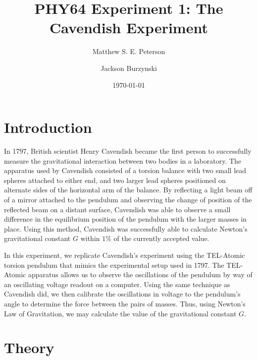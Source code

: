 \documentclass[aps, reprint,amsmath,amssymb]{revtex4-1} %
\begin{document}
\title{PHY64 Experiment 1: The Cavendish Experiment}
\author{Matthew S. E. Peterson}
\author{Jackson Burzynski}
\date{\today} 
\maketitle

\section{Introduction}

In 1797, British scientist Henry Cavendish became the first person to successfully measure the gravitational interaction between two bodies in a laboratory. The apparatus used by Cavendish consisted of a torsion balance with two small lead spheres attached to either end, and two larger lead spheres positioned on alternate sides of the horizontal arm of the balance. By reflecting a light beam off of a mirror attached to the pendulum and observing the change of position of the reflected beam on a distant surface, Cavendish was able to observe a small difference in the equilibrium position of the pendulum with the larger masses in place. Using this method, Cavendish was successfully able to calculate Newton's gravitational constant $G$ within $1\%$ of the currently accepted value. 

In this experiment, we replicate Cavendish's experiment using the TEL-Atomic torsion pendulum that mimics the experimental setup used in 1797. The TEL-Atomic apparatus allows us to observe the oscillations of the pendulum by way of an oscillating voltage readout on a computer. Using the same technique as Cavendish did, we then calibrate the oscillations in voltage to the pendulum's angle to determine the force between the pairs of masses. Thus, using Newton's Law of Gravitation, we may calculate the value of the gravitational constant $G$.

\section{Theory}
\end{document}
